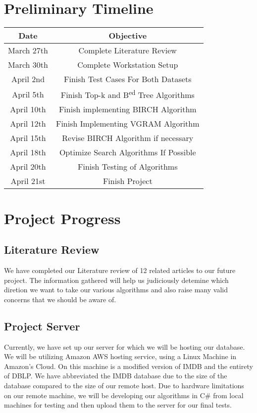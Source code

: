 \documentclass[pdftex,12pt,letter]{article}
\begin{document}
\section{Preliminary Timeline}
\begin{tabular} {| c | c |}
\hline
\bf{Date} & \bf{Objective}\\ \hline
March 27th & Complete Literature Review\\ \hline
March 30th & Complete Workstation Setup\\ \hline
April 2nd & Finish Test Cases For Both Datasets\\ \hline
April 5th & Finish Top-k and B\textsuperscript{ed} Tree Algorithms\\ \hline
April 10th & Finish implementing BIRCH Algorithm \\ \hline
April 12th & Finish Implementing VGRAM Algorithm\\ \hline
April 15th & Revise BIRCH Algorithm if necessary\\ \hline
April 18th & Optimize Search Algorithms If Possible\\ \hline
April 20th & Finish Testing of Algorithms\\ \hline
April 21st & Finish Project\\ \hline
\end{tabular}

\section{Project Progress}
\subsection{Literature Review}
We have completed our Literature review of 12 related articles to our future project. The information gathered will help us judiciously detemine which diretion we want to take our various algorithms and also raise many valid concerns that we should be aware of. 
\subsection{Project Server}
Currently, we have set up our server for which we will be hosting our database. We will be utilizing Amazon AWS hosting service, using a Linux Machine in Amazon's Cloud. On this machine is a modified version of IMDB and the entirety of DBLP. We have abbreviated the IMDB database due to the size of the database compared to the size of our remote host. Due to hardware limitations on our remote machine, we will be developing our algorithms in C\# from local machines for testing and then upload them to the server for our final tests.
\end{document}
